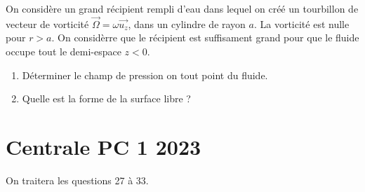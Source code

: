 \documentclass{article}
\begin{document}
On considère un grand récipient rempli d'eau dans lequel on créé un tourbillon de vecteur de vorticité $\vec{\Omega} = \omega \vec{u_z}$, dans un cylindre de rayon $a$.
La vorticité est nulle pour $r>a$. 
On considèrre que le récipient est suffisament grand pour que le fluide occupe tout le demi-espace $z<0$.
\begin{enumerate}
  \item Déterminer le champ de pression on tout point du fluide. 
  \item Quelle est la forme de la surface libre ? 


\end{enumerate}

\section{Centrale PC 1 2023}

On traitera les questions 27 à 33. 
\end{document}
